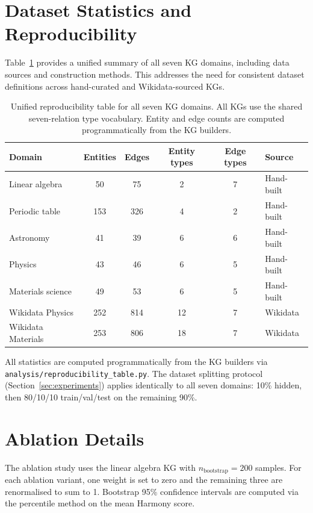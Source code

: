\section{Dataset Statistics and Reproducibility}\label{app:datasets}

Table~\ref{tab:reproducibility} provides a unified summary of all seven KG
domains, including data sources and construction methods.  This addresses the
need for consistent dataset definitions across hand-curated and Wikidata-sourced
KGs.

\begin{table}[h]
\centering
\caption{Unified reproducibility table for all seven KG domains.  All KGs use
the shared seven-relation type vocabulary.  Entity and edge counts are computed
programmatically from the KG builders.}\label{tab:reproducibility}
\begin{tabular}{lccccl}
\toprule
Domain & Entities & Edges & Entity types & Edge types & Source \\
\midrule
Linear algebra     & 50  & 75  & 2 & 7 & Hand-built \\
Periodic table     & 153 & 326 & 4 & 2 & Hand-built \\
Astronomy          & 41  & 39  & 6 & 6 & Hand-built \\
Physics            & 43  & 46  & 6 & 5 & Hand-built \\
Materials science  & 49  & 53  & 6 & 5 & Hand-built \\
Wikidata Physics   & 252 & 814 & 12 & 7 & Wikidata \\
Wikidata Materials & 253 & 806 & 18 & 7 & Wikidata \\
\bottomrule
\end{tabular}
\end{table}

\noindent All statistics are computed programmatically from the KG builders
via \texttt{analysis/reproducibility\_table.py}.  The dataset splitting protocol
(Section~\ref{sec:experiments}) applies identically to all seven domains:
10\% hidden, then 80/10/10 train/val/test on the remaining 90\%.

\section{Ablation Details}\label{app:ablation}

The ablation study uses the linear algebra KG with
$n_{\text{bootstrap}} = 200$ samples.  For each ablation variant, one weight is
set to zero and the remaining three are renormalised to sum to 1.  Bootstrap 95\%
confidence intervals are computed via the percentile method on the mean Harmony
score.

